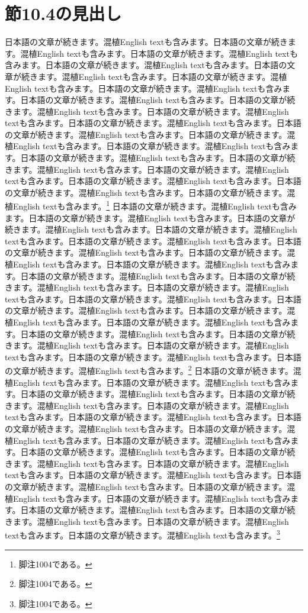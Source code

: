 \documentclass[pdflatex,book]{jlreq}
\begin{document}
\section{節10.4の見出し}
日本語の文章が続きます。混植English textも含みます。日本語の文章が続きます。混植English textも含みます。日本語の文章が続きます。混植English textも含みます。日本語の文章が続きます。混植English textも含みます。日本語の文章が続きます。混植English textも含みます。日本語の文章が続きます。混植English textも含みます。日本語の文章が続きます。混植English textも含みます。日本語の文章が続きます。混植English textも含みます。日本語の文章が続きます。混植English textも含みます。日本語の文章が続きます。混植English textも含みます。日本語の文章が続きます。混植English textも含みます。日本語の文章が続きます。混植English textも含みます。日本語の文章が続きます。混植English textも含みます。日本語の文章が続きます。混植English textも含みます。日本語の文章が続きます。混植English textも含みます。日本語の文章が続きます。混植English textも含みます。日本語の文章が続きます。混植English textも含みます。日本語の文章が続きます。混植English textも含みます。日本語の文章が続きます。混植English textも含みます。日本語の文章が続きます。混植English textも含みます。\footnote{脚注1004である。}
日本語の文章が続きます。混植English textも含みます。日本語の文章が続きます。混植English textも含みます。日本語の文章が続きます。混植English textも含みます。日本語の文章が続きます。混植English textも含みます。日本語の文章が続きます。混植English textも含みます。日本語の文章が続きます。混植English textも含みます。日本語の文章が続きます。混植English textも含みます。日本語の文章が続きます。混植English textも含みます。日本語の文章が続きます。混植English textも含みます。日本語の文章が続きます。混植English textも含みます。日本語の文章が続きます。混植English textも含みます。日本語の文章が続きます。混植English textも含みます。日本語の文章が続きます。混植English textも含みます。日本語の文章が続きます。混植English textも含みます。日本語の文章が続きます。混植English textも含みます。日本語の文章が続きます。混植English textも含みます。日本語の文章が続きます。混植English textも含みます。日本語の文章が続きます。混植English textも含みます。日本語の文章が続きます。混植English textも含みます。日本語の文章が続きます。混植English textも含みます。\footnote{脚注1004である。}
日本語の文章が続きます。混植English textも含みます。日本語の文章が続きます。混植English textも含みます。日本語の文章が続きます。混植English textも含みます。日本語の文章が続きます。混植English textも含みます。日本語の文章が続きます。混植English textも含みます。日本語の文章が続きます。混植English textも含みます。日本語の文章が続きます。混植English textも含みます。日本語の文章が続きます。混植English textも含みます。日本語の文章が続きます。混植English textも含みます。日本語の文章が続きます。混植English textも含みます。日本語の文章が続きます。混植English textも含みます。日本語の文章が続きます。混植English textも含みます。日本語の文章が続きます。混植English textも含みます。日本語の文章が続きます。混植English textも含みます。日本語の文章が続きます。混植English textも含みます。日本語の文章が続きます。混植English textも含みます。日本語の文章が続きます。混植English textも含みます。日本語の文章が続きます。混植English textも含みます。日本語の文章が続きます。混植English textも含みます。日本語の文章が続きます。混植English textも含みます。\footnote{脚注1004である。}
\end{document}
